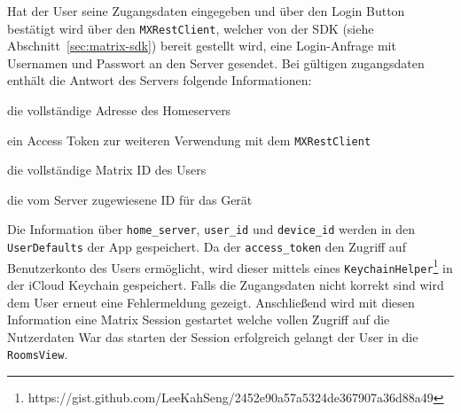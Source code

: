     Hat der User seine Zugangsdaten eingegeben und über den Login Button bestätigt wird über den \texttt{MXRestClient}, welcher von der SDK (siehe Abschnitt~\ref{sec:matrix-sdk}) bereit gestellt wird, eine Login-Anfrage mit Usernamen und Passwort an den Server gesendet.
    Bei gültigen zugangsdaten enthält die Antwort des Servers folgende Informationen:
    \begin{description}[leftmargin=!,labelwidth=3cm]
        \item [home\_server] die vollständige Adresse des Homeservers
        \item [access\_token] ein Access Token zur weiteren Verwendung mit dem \texttt{MXRestClient}
        \item [user\_id] die vollständige Matrix ID des Users
        \item [device\_id] die vom Server zugewiesene ID für das Gerät
    \end{description}
    Die Information über \texttt{home\_server}, \texttt{user\_id} und \texttt{device\_id} werden in den \texttt{UserDefaults} der App gespeichert.
    Da der \texttt{access\_token} den Zugriff auf Benutzerkonto des Users ermöglicht, wird dieser mittels eines \texttt{KeychainHelper}\footnote{https://gist.github.com/LeeKahSeng/2452e90a57a5324de367907a36d88a49} in der iCloud Keychain gespeichert.
    Falls die Zugangsdaten nicht korrekt sind wird dem User erneut eine Fehlermeldung gezeigt.
    Anschließend wird mit diesen Information eine Matrix Session gestartet welche vollen Zugriff auf die Nutzerdaten
    War das starten der Session erfolgreich gelangt der User in die \texttt{RoomsView}.\\

